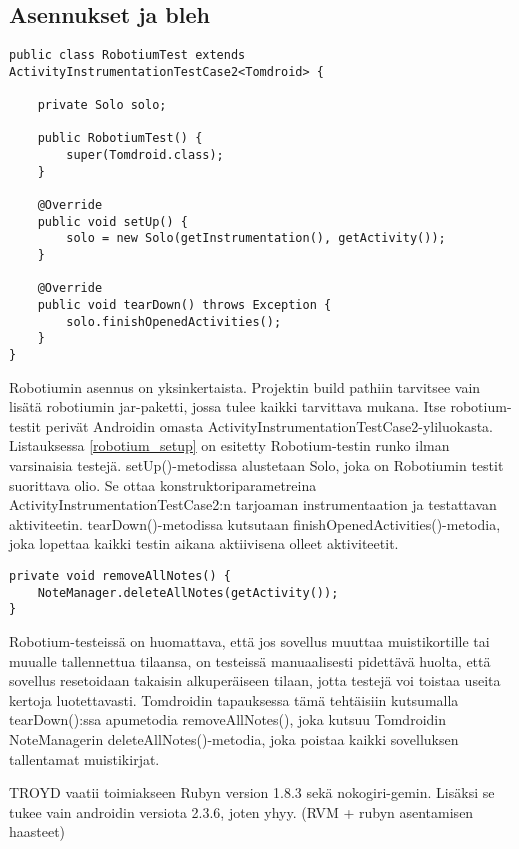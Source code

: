 \subsection{Asennukset ja bleh}

\begin{lstlisting}[float,label=robotium_setup,caption=Robotium testirunko]
public class RobotiumTest extends ActivityInstrumentationTestCase2<Tomdroid> {

	private Solo solo;
	
	public RobotiumTest() {
		super(Tomdroid.class);
	}
	
	@Override
	public void setUp() {
		solo = new Solo(getInstrumentation(), getActivity());
	}
	
	@Override
	public void tearDown() throws Exception {
		solo.finishOpenedActivities();
	}
}
\end{lstlisting}

Robotiumin asennus on yksinkertaista. Projektin build pathiin tarvitsee vain lisätä robotiumin jar-paketti, jossa tulee kaikki tarvittava mukana. Itse robotium-testit perivät Androidin omasta ActivityInstrumentationTestCase2-yliluokasta. Listauksessa \ref{robotium_setup} on esitetty Robotium-testin runko ilman varsinaisia testejä. setUp()-metodissa alustetaan Solo, joka on Robotiumin testit suorittava olio. Se ottaa konstruktoriparametreina ActivityInstrumentationTestCase2:n tarjoaman instrumentaation ja testattavan aktiviteetin. tearDown()-metodissa kutsutaan finishOpenedActivities()-metodia, joka lopettaa kaikki testin aikana aktiivisena olleet aktiviteetit.

\begin{lstlisting}[float,label=delete_notes,caption=Muistikirjojen poisto]
private void removeAllNotes() {
	NoteManager.deleteAllNotes(getActivity());
}
\end{lstlisting}

Robotium-testeissä on huomattava, että jos sovellus muuttaa muistikortille tai muualle tallennettua tilaansa, on testeissä manuaalisesti pidettävä huolta, että sovellus resetoidaan takaisin alkuperäiseen tilaan, jotta testejä voi toistaa useita kertoja luotettavasti. Tomdroidin tapauksessa tämä tehtäisiin kutsumalla tearDown():ssa apumetodia removeAllNotes(), joka kutsuu Tomdroidin NoteManagerin deleteAllNotes()-metodia, joka poistaa kaikki sovelluksen tallentamat muistikirjat.

TROYD vaatii toimiakseen Rubyn version 1.8.3 sekä nokogiri-gemin. Lisäksi se tukee vain androidin versiota 2.3.6, joten yhyy. (RVM + rubyn asentamisen haasteet)

